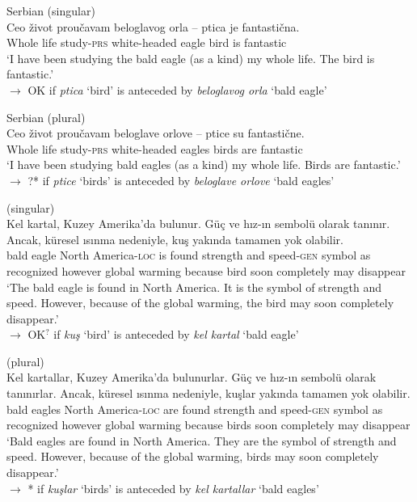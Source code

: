 \documentclass[output=paper,
modfonts
]{langscibook}
\begin{document}
	\ea \label{ex:despic:46}
	Serbian (singular) \\
	\gll 
	{Ceo} {\v zivot} {prou\v cavam} {beloglavog} {orla} {--} {ptica} {je} {fantasti\v cna}. \\
	Whole life study-\textsc{prs} white-headed eagle {} bird is fantastic \\
	\glt `I have been studying the bald eagle (as a kind) my whole life. The bird is fantastic.' \\
	$\rightarrow$ OK if \textit{ptica} `bird' is anteceded by \textit{beloglavog orla} `bald eagle'
	\z 
	
	\ea \label{ex:despic:47} 
	Serbian (plural) \\
	\gll 
	{Ceo} {\v zivot} {prou\v cavam} {beloglave} {orlove} {--} {ptice} {su} {fantasti\v cne.} \\
	Whole life study-\textsc{prs} white-headed eagles {} birds are fantastic \\
	\glt `I have been studying bald eagles (as a kind) my whole life. Birds are fantastic.' \\
	$\rightarrow$ ?* if \textit{ptice} `birds' is anteceded by \textit{beloglave orlove} `bald eagles'
	\z \newpage
	
	\ea \label{ex:despic:48}
	 (singular) \\
	\gll 
	{Kel} {kartal}, {Kuzey} {Amerika'da} {bulunur}. {G\"u\c c} {ve} {h\i z-\i n} {sembol\"u} {olarak} {tan\i n\i r.} {Ancak}, {k\"uresel} {\i s\i nma} {nedeniyle}, {ku\c s} {yak\i nda} {tamamen} {yok} {olabilir}. \\
	bald eagle North America-\textsc{loc} {is found} strength and speed-\textsc{gen} symbol as recognized however global warming because bird soon completely may disappear \\
	\glt `The bald eagle is found in North America. It is the symbol of strength and speed. However, because of the global warming, the bird may soon completely disappear.' \\
	$\rightarrow$ OK$^?$ if \textit{ku\c s} `bird' is anteceded by \textit{kel kartal} `bald eagle'
	\z 
	
	
	\ea \label{ex:despic:49} 
	 (plural) \\
	\gll 
	{Kel} {kartallar}, {Kuzey} {Amerika'da} {bulunurlar}. {G\"u\c c} {ve} {h\i z-\i n} {sembol\"u} {olarak} {tan\i n\i rlar}. {Ancak}, {k\"uresel} {\i s\i nma} {nedeniyle}, {ku\c slar} {yak\i nda} {tamamen} {yok} {olabilir}. \\
	bald eagles North America-\textsc{loc} {are found} strength and speed-\textsc{gen} symbol as recognized however global warming because birds soon completely may disappear \\
	\glt `Bald eagles are found in North America. They are the symbol of strength and speed. However, because of the global warming, birds may soon completely disappear.' \\
	$\rightarrow$ * if \textit{ku\c slar} `birds' is anteceded by \textit{kel kartallar} `bald eagles' 
	\z 
	
\end{document}
